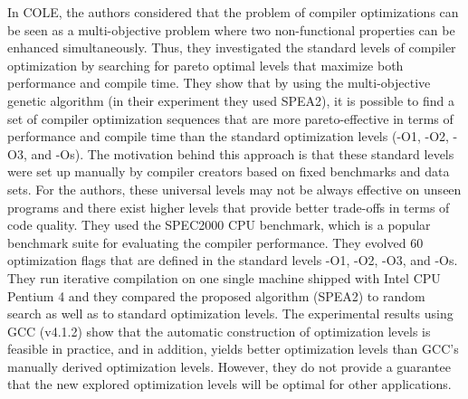 In COLE\cite{hoste2008cole}, the authors considered that the problem of compiler optimizations can be seen as a multi-objective problem where two non-functional properties can be enhanced simultaneously. Thus, they investigated the standard levels of compiler optimization by searching for pareto optimal levels that maximize both performance and compile time. 
They show that by using the multi-objective genetic algorithm (in their experiment they used SPEA2), it is possible to find a set of compiler optimization sequences that are more pareto-effective in terms of performance and compile time than the standard optimization levels (-O1, -O2, -O3, and -Os). The motivation behind this approach is that these standard levels were set up manually by compiler creators based on fixed benchmarks and data sets. For the authors, these universal levels may not be always effective on unseen programs and there exist higher levels that provide better trade-offs in terms of code quality.
They used the SPEC2000 CPU benchmark, which is a popular benchmark suite for evaluating the compiler performance. They evolved 60 optimization flags that are defined in the standard levels -O1, -O2, -O3, and -Os. They run iterative compilation on one single machine shipped with Intel CPU Pentium 4 and they compared the proposed algorithm (SPEA2) to random search as well as to standard optimization levels.
The experimental results using GCC (v4.1.2) show that the automatic construction of optimization levels is feasible in practice, and in addition, yields better optimization levels than GCC’s manually derived optimization levels.
However, they do not provide a guarantee that the new explored optimization levels will be optimal for other applications.


